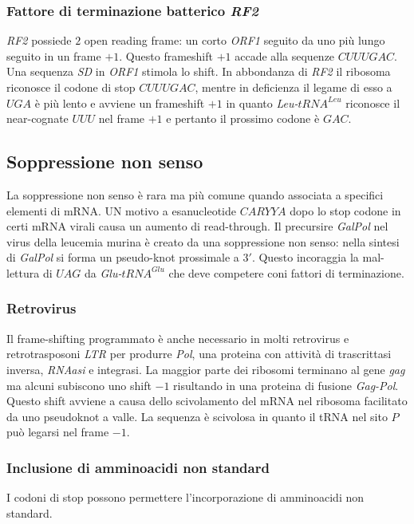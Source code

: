 \subsubsection{Fattore di terminazione batterico \emph{RF2}}
\emph{RF2} possiede $2$ open reading frame: un corto \emph{ORF1} seguito da uno pi\`u lungo seguito in un frame $+1$. Questo frameshift $+1$ accade alla sequenze $CUU UGA C$. Una
sequenza \emph{SD} in \emph{ORF1} stimola lo shift. In abbondanza di \emph{RF2} il ribosoma riconosce il codone di stop $CUUUGAC$, mentre in deficienza il legame di esso a $UGA$ 
\`e pi\`u lento e avviene un frameshift $+1$ in quanto \emph{Leu-$tRNA^{Leu}$} riconosce il near-cognate $UUU$ nel frame $+1$ e pertanto il prossimo codone \`e $GAC$. 
\subsection{Soppressione non senso}
La soppressione non senso \`e rara ma pi\`u comune quando associata a specifici elementi di mRNA. UN motivo a esanucleotide $CARYYA$ dopo lo stop codone in certi mRNA virali causa
un aumento di read-through. Il precursire \emph{GalPol} nel virus della leucemia murina \`e creato da una soppressione non senso: nella sintesi di \emph{GalPol} si forma un 
pseudo-knot prossimale a $3'$. Questo incoraggia la mal-lettura di $UAG$ da \emph{Glu-$tRNA^{Glu}$} che deve competere coni fattori di terminazione. 
\subsubsection{Retrovirus}
Il frame-shifting programmato \`e anche necessario in molti retrovirus e retrotrasposoni \emph{LTR} per produrre \emph{Pol}, una proteina con attivit\`a di trascrittasi inversa, \emph{RNAasi} e integrasi.
La maggior parte dei ribosomi terminano al gene \emph{gag} ma alcuni subiscono uno shift $-1$ risultando in una proteina di fusione \emph{Gag-Pol}. Questo shift avviene a causa dello scivolamento 
del mRNA nel ribosoma facilitato da uno pseudoknot a valle. La sequenza \`e scivolosa in quanto il tRNA nel sito $P$ pu\`o legarsi nel frame $-1$. 
\subsubsection{Inclusione di amminoacidi non standard}
I codoni di stop possono permettere l'incorporazione di amminoacidi non standard.

